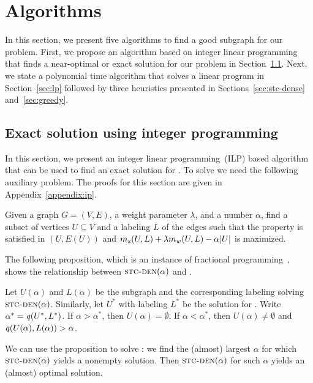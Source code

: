 \section{Algorithms}\label{sec:algorithm}


In this section, we present five algorithms to find a good subgraph for our \prbstrwk problem. 
First, we propose an algorithm based on integer linear programming that finds a near-optimal or exact solution for our problem in Section~\ref{sec:ip}. Next, we state a polynomial time algorithm that solves a linear program in Section~\ref{sec:lp} followed by three heuristics presented in Sections~\ref{sec:stc-dense} and~\ref{sec:greedy}.


\subsection{Exact solution using integer programming}\label{sec:ip}

In this section, we present an integer linear programming~(ILP) based algorithm that can be used to find an exact solution for \prbstrwk.
To solve \prbstrwk we need the following auxiliary problem. The proofs for this section are given in Appendix~\ref{appendix:ip}.


\begin{problem}[$\prbstrwk(\alpha)$]
\label{pr:label-subgrap-str-wk-alpha}
Given a graph $G = (V, E)$, a weight parameter $\lambda$, and a number $\alpha$, find a subset of vertices $U \subseteq V$ and a labeling $L$ of the edges such that the \stc property is satisfied in $(U, E(U))$ and $m_s(U, L) + \lambda m_w(U, L) - \alpha {\left|U\right|}$ is maximized.
\end{problem}

The following proposition, which is an instance of fractional programming~\citep{dinkelbach1967nonlinear}, shows the relationship between $\prbstrwk(\alpha)$ and \prbstrwk.

\begin{proposition}
\label{prop:frac}
Let $U(\alpha)$ and $L(\alpha)$ be the subgraph and the corresponding labeling solving $\prbstrwk(\alpha)$. Similarly, let $U^*$ with labeling $L^*$ be the solution for \prbstrwk. Write $\alpha^* = \score{U^*, L^*}$. If $\alpha > \alpha^*$, then $U(\alpha) = \emptyset$. If $\alpha < \alpha^*$, then $U(\alpha) \neq \emptyset$ and $\score{U(\alpha), L(\alpha)} > \alpha$.
\end{proposition}



We can use the proposition to solve \prbstrwk: we find the (almost) largest $\alpha$ for which $\prbstrwk(\alpha)$ yields a nonempty solution. Then $\prbstrwk(\alpha)$ for such $\alpha$ yields an (almost) optimal solution.

